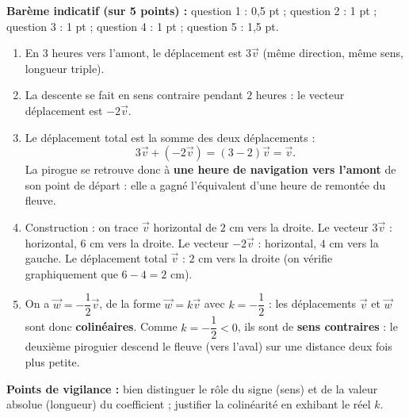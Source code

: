 \documentclass[11pt]{article}
\begin{document}
\begin{corrige}
\textbf{Barème indicatif (sur 5 points) :} question 1 : 0,5 pt ; question 2 : 1 pt ; question 3 : 1 pt ; question 4 : 1 pt ; question 5 : 1,5 pt.
\begin{enumerate}
\item En $3$ heures vers l'amont, le déplacement est $3\vec{v}$ (même direction, même sens, longueur triple).
\item La descente se fait en sens contraire pendant $2$ heures : le vecteur déplacement est $-2\vec{v}$.
\item Le déplacement total est la somme des deux déplacements :
\[ 3\vec{v} + (-2\vec{v}) = (3-2)\vec{v} = \vec{v}. \]
La pirogue se retrouve donc à \textbf{une heure de navigation vers l'amont} de son point de départ : elle a gagné l'équivalent d'une heure de remontée du fleuve.
\item Construction : on trace $\vec{v}$ horizontal de $2$ cm vers la droite. Le vecteur $3\vec{v}$ : horizontal, $6$ cm vers la droite. Le vecteur $-2\vec{v}$ : horizontal, $4$ cm vers la gauche. Le déplacement total $\vec{v}$ : $2$ cm vers la droite (on vérifie graphiquement que $6 - 4 = 2$ cm).
\item On a $\vec{w} = -\dfrac{1}{2}\vec{v}$, de la forme $\vec{w} = k\vec{v}$ avec $k = -\dfrac{1}{2}$ : les déplacements $\vec{v}$ et $\vec{w}$ sont donc \textbf{colinéaires}. Comme $k = -\dfrac{1}{2} < 0$, ils sont de \textbf{sens contraires} : le deuxième piroguier descend le fleuve (vers l'aval) sur une distance deux fois plus petite.
\end{enumerate}
\textbf{Points de vigilance :} bien distinguer le rôle du signe (sens) et de la valeur absolue (longueur) du coefficient ; justifier la colinéarité en exhibant le réel $k$.
\end{corrige}
\end{document}
